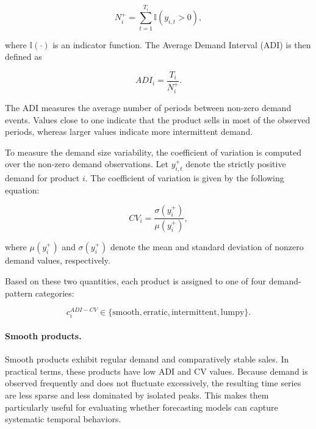 \begin{equation}
    N_i^+ = \sum_{t=1}^{T_i} \mathbb{I}(y_{i,t} > 0),
    \label{eq:non_zero_periods}
\end{equation}

where \(\mathbb{I}(\cdot)\) is an indicator function. The Average Demand Interval (ADI) is then defined as

\begin{equation}
    ADI_i = \frac{T_i}{N_i^+}.
    \label{eq:adi}
\end{equation}

The ADI measures the average number of periods between non-zero demand events. Values close to one indicate that the product sells in most of the observed periods, whereas larger values indicate more intermittent demand.

To measure the demand size variability, the coefficient of variation is computed over the non-zero demand observations. Let \(y_{i,t}^+\) denote the strictly positive demand for product \(i\). The coefficient of variation is given by the following equation:

\begin{equation}
    CV_i =
    \frac{
        \sigma(y_i^+)
    }{
        \mu(y_i^+)
    },
    \label{eq:cv}
\end{equation}

where \(\mu(y_i^+)\) and \(\sigma(y_i^+)\) denote the mean and standard deviation of nonzero demand values, respectively.

Based on these two quantities, each product is assigned to one of four demand-pattern categories:

\begin{equation}
    c_i^{ADI-CV} \in
    \{
    \text{smooth},
    \text{erratic},
    \text{intermittent},
    \text{lumpy}
    \}.
    \label{eq:adi_cv_classes}
\end{equation}


\paragraph{Smooth products.}
Smooth products exhibit regular demand and comparatively stable sales. In practical terms, these products have low ADI and CV values. Because demand is observed frequently and does not fluctuate excessively, the resulting time series are less sparse and less dominated by isolated peaks. This makes them particularly useful for evaluating whether forecasting models can capture systematic temporal behaviors.

